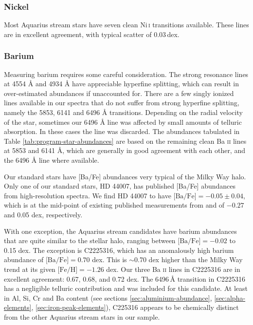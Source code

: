 \documentclass{emulateapj}
\begin{document}
\subsubsection{Nickel}
Most Aquarius stream stars have seven clean Ni\,\textsc{i} transitions available. These lines are in excellent agreement, with typical scatter of 0.03\,dex.


\subsubsection{Barium}

Measuring barium requires some careful consideration. The strong resonance lines at 4554 {\AA} and 4934 {\AA} have appreciable hyperfine splitting, which can result in over-estimated abundances if unaccounted for. There are a few singly ionized lines available in our spectra that do not suffer from strong hyperfine splitting, namely the 5853, 6141 and 6496 {\AA} transitions. Depending on the radial velocity of the star, sometimes our 6496 {\AA} line was affected by small amounts of telluric absorption. In these cases the line was discarded. The abundances tabulated in Table \ref{tab:program-star-abundances} are based on the remaining clean Ba \textsc{ii} lines at 5853 and 6141 {\AA}, which are generally in good agreement with each other, and the 6496 {\AA} line where available.

Our standard stars have [Ba/Fe] abundances very typical of the Milky Way halo. Only one of our standard stars, HD 44007, has published [Ba/Fe] abundances from high-resolution spectra. We find HD 44007 to have $\mbox{[Ba/Fe]} = -0.05 \pm 0.04$, which is at the mid-point of existing published measurements from \citet{fulbright_2000} and \citet{burris;et-al_2000} of $-0.27$ and 0.05 dex, respectively. 

With one exception, the Aquarius stream candidates have barium abundances that are quite similar to the stellar halo, ranging between $\mbox{[Ba/Fe]} = -0.02$ to 0.15 dex. The exception is C2225316, which has an anomalously high barium abundance of $\mbox{[Ba/Fe]} = 0.70$ dex. This is ${\sim}$0.70 dex higher than the Milky Way trend at its given $\mbox{[Fe/H]} = -1.26$ dex. Our three Ba \textsc{ii} lines in C2225316 are in excellent agreement: 0.67, 0.68, and 0.72 dex. The 6496\,{\AA} transition in C2225316 has a negligible telluric contribution and was included for this candidate. At least in Al, Si, Cr and Ba content (see sections \ref{sec:aluminium-abundance}, \ref{sec:alpha-elements}, \ref{sec:iron-peak-elements}), C225316 appears to be chemically distinct from the other Aquarius stream stars in our sample. 
\end{document}
